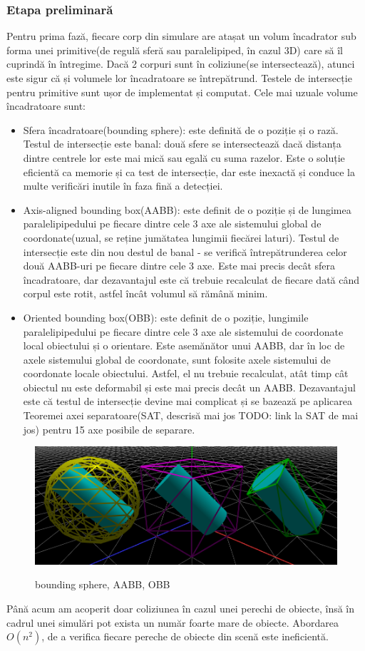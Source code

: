 \documentclass[12pt,a4paper]{report}
\begin{document}
\subsubsection{Etapa preliminară}
Pentru prima fază, fiecare corp din simulare are atașat un volum încadrator sub forma unei primitive(de regulă sferă sau paralelipiped, în cazul 3D) care să îl cuprindă în întregime. Dacă 2 corpuri sunt în coliziune(se intersectează), atunci este sigur că și volumele lor încadratoare se întrepătrund. Testele de intersecție pentru primitive sunt ușor de implementat și computat.
Cele mai uzuale volume încadratoare sunt:
\begin{itemize}
	\item Sfera încadratoare(bounding sphere): este definită de o poziție și o rază. Testul de intersecție este banal: două sfere se intersectează dacă distanța dintre centrele lor este mai mică sau egală cu suma razelor. Este o soluție eficientă ca memorie și ca test de intersecție, dar este inexactă și conduce la multe verificări inutile în faza fină a detecției.
	\item Axis-aligned bounding box(AABB): este definit de o poziție și de lungimea paralelipipedului pe fiecare dintre cele 3 axe ale sistemului global de coordonate(uzual, se reține jumătatea lungimii fiecărei laturi). Testul de intersecție este din nou destul de banal - se verifică întrepătrunderea celor două AABB-uri pe fiecare dintre cele 3 axe. Este mai precis decât sfera încadratoare, dar dezavantajul este că trebuie recalculat de fiecare dată când corpul este rotit, astfel încât volumul să rămână minim.
	\item Oriented bounding box(OBB): este definit de o poziție, lungimile paralelipipedului pe fiecare dintre cele 3 axe ale sistemului de coordonate local obiectului și o orientare. Este asemănător unui AABB, dar în loc de axele sistemului global de coordonate, sunt folosite axele sistemului de coordonate locale obiectului. Astfel, el nu trebuie recalculat, atât timp cât obiectul nu este deformabil și este mai precis decât un AABB. Dezavantajul este că testul de intersecție devine mai complicat și se bazează pe aplicarea Teoremei axei separatoare(SAT, descrisă mai jos TODO: link la SAT de mai jos) pentru 15 axe posibile de separare.
\end{itemize}
\begin{figure}[H]
	\centering
	\includegraphics[width=0.7\linewidth]{pics/cap3_00.png}
	\label{fig:cap3_00}
	\caption[volume încadratoare uzuale]{bounding sphere, AABB, OBB}
\end{figure}
Până acum am acoperit doar coliziunea în cazul unei perechi de obiecte, însă în cadrul unei simulări pot exista un număr foarte mare de obiecte. Abordarea $O(n^2)$, de a verifica fiecare pereche de obiecte din scenă este ineficientă.
\end{document}

